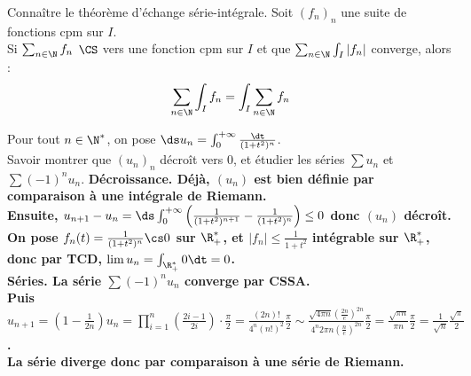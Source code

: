 \documentclass[french, 11pt]{article}
\begin{document}
\begin{question}{}{}
    Connaître le théorème d'échange série-intégrale.
    \tcblower
    Soit $(f_n)_n$ une suite de fonctions cpm sur $I$.\\
    Si $\sum_{n\in\N} f_n$ $\CS$ vers une fonction cpm sur $I$ et que  $\sum_{n \in \N}\int_I |f_n|$ converge, alors :
    \begin{equation*}
        \sum_{n\in \N} \int_I f_n = \int_I \sum_{n\in \N} f_n
    \end{equation*}
\end{question}

\begin{question}{}{}
    Pour tout $n\in\N^*$, on pose $\ds u_n=\int_0^{+\infty}\frac{\dt}{(1+t^2)^n}$.\\
    Savoir montrer que $(u_n)_n$ décroît vers 0, et étudier les séries $\sum u_n$ et $\sum (-1)^n u_n$.
    \tcblower
    \bf{Décroissance.} Déjà, $(u_n)$ est bien définie par comparaison à une intégrale de Riemann.\\
    Ensuite, $u_{n+1} - u_n = \ds\int_0^{+\infty} \left( \frac{1}{(1+t^2)^{n+1}} - \frac{1}{(1+t^2)^n} \right)\leq 0$ donc $(u_n)$ décroît.\\
    On pose $f_n(t) = \frac{1}{(1+t^2)^n}\cs0$ sur $\R_+^*$, et $|f_n|\leq\frac{1}{1+t^2}$ intégrable sur $\R_+^*$, donc par TCD, $\lim u_n = \int_{\R_+^*} 0\dt=0$.\\
    \bf{Séries.} La série $\sum(-1)^nu_n$ converge par CSSA.\\
    Puis $u_{n+1} = (1-\frac{1}{2n})u_n = \prod_{i=1}^n\left( \frac{2i-1}{2i} \right) \cdot \frac{\pi}{2} = \frac{(2n)!}{4^n(n!)^2}\frac{\pi}{2}\sim \frac{\sqrt{4\pi n}\left( \frac{2n}{e} \right)^{2n}}{4^n2\pi n\left(\frac{n}{e}\right)^{2n}}\frac{\pi}{2}=\frac{\sqrt{\pi n}}{\pi n}\frac{\pi}{2} = \frac{1}{\sqrt{n}}\frac{\sqrt{\pi}}{2}$. \\
    La série diverge donc par comparaison à une série de Riemann.
\end{question}
\end{document}
